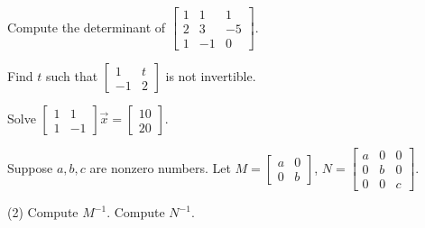\setcounter{exercise}{100}

\begin{exercise}
Compute the determinant of
$\left[ \begin{smallmatrix}
1 & 1 & 1 \\
2 & 3 & -5 \\
1 & -1 & 0
\end{smallmatrix}\right]$.
\end{exercise}

\begin{exercise}
Find $t$ such that
$\left[ \begin{smallmatrix}
1 & t \\
-1 & 2
\end{smallmatrix}\right]$
is not invertible.
\end{exercise}

\begin{exercise}
Solve
$\left[ \begin{smallmatrix}
1 & 1 \\
1 & -1
\end{smallmatrix}\right] \vec{x} = 
\left[ \begin{smallmatrix}
10 \\ 20
\end{smallmatrix}\right]$.
\end{exercise}

\begin{exercise}
Suppose $a, b, c$ are nonzero numbers.
Let
$M=\left[ \begin{smallmatrix}
a & 0 \\
0 & b
\end{smallmatrix}\right]$,
$N=\left[ \begin{smallmatrix}
a & 0 & 0 \\
0 & b & 0 \\
0 & 0 & c
\end{smallmatrix}\right]$.
\begin{tasks}(2)
\task Compute $M^{-1}$.
\task Compute $N^{-1}$.
\end{tasks}
\end{exercise}

